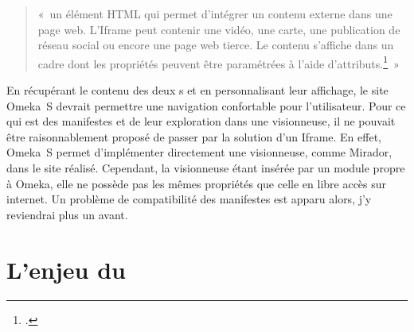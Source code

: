 \begin{quote}
	« un élément HTML qui permet d'intégrer un contenu externe dans une page web. L'Iframe peut contenir une vidéo, une carte, une publication de réseau social ou encore une page web tierce. Le contenu s'affiche dans un cadre dont les propriétés peuvent être paramétrées à l'aide d'attributs.\footcite{thach_quest-ce_nodate} »
\end{quote}\par
En récupérant le contenu des deux s et en personnalisant leur affichage, le site Omeka~S devrait permettre une navigation confortable pour l’utilisateur. Pour ce qui est des manifestes  et de leur exploration dans une visionneuse, il ne pouvait être raisonnablement proposé de passer par la solution d’un Iframe. En effet, Omeka~S permet d’implémenter directement une visionneuse, comme Mirador, dans le site réalisé. Cependant, la visionneuse étant insérée par un module propre à Omeka, elle ne possède pas les mêmes propriétés que celle en libre accès sur internet. Un problème de compatibilité des manifestes  est apparu alors, j’y reviendrai plus un avant.\newpage

\section{L’enjeu du }

